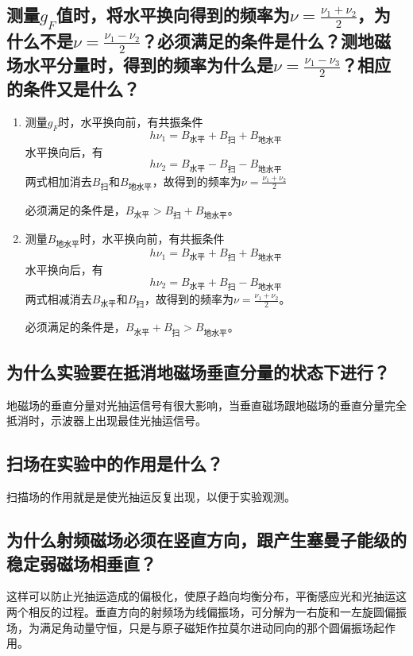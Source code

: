 \documentclass[a4paper]{article}
\begin{document}
\subsection{测量$g_F$值时，将水平换向得到的频率为$\nu = \frac{\nu_1+\nu_2}{2}$，为什么不是$\nu = \frac{\nu_1-\nu_2}{2}$？必须满足的条件是什么？测地磁场水平分量时，得到的频率为什么是$\nu = \frac{\nu_1-\nu_3}{2}$？相应的条件又是什么？}
\begin{enumerate}
\item 测量$g_F$时，水平换向前，有共振条件
\begin{equation*}
h\nu_1 = B_{\text{水平}}+B_{\text{扫}}+B_{\text{地水平}}
\end{equation*}
水平换向后，有
\begin{equation*}
h\nu_2 = B_{\text{水平}}-B_{\text{扫}}-B_{\text{地水平}}
\end{equation*}
两式相加消去$B_{\text{扫}}$和$B_{\text{地水平}}$，故得到的频率为$\nu = \frac{\nu_1+\nu_2}{2}$

必须满足的条件是，$B_{\text{水平}}>B_{\text{扫}}+B_{\text{地水平}}$。
\item 测量$B_{\text{地水平}}$时，水平换向前，有共振条件
\begin{equation*}
h\nu_1 = B_{\text{水平}}+B_{\text{扫}}+B_{\text{地水平}}
\end{equation*}
水平换向后，有
\begin{equation*}
h\nu_2 = B_{\text{水平}}+B_{\text{扫}}-B_{\text{地水平}}
\end{equation*}
两式相减消去$B_{\text{水平}}$和$B_{\text{扫}}$，故得到的频率为$\nu = \frac{\nu_1+\nu_2}{2}$。

必须满足的条件是，$B_{\text{水平}}+B_{\text{扫}}>B_{\text{地水平}}$。
\end{enumerate}
\subsection{为什么实验要在抵消地磁场垂直分量的状态下进行？}
地磁场的垂直分量对光抽运信号有很大影响，当垂直磁场跟地磁场的垂直分量完全抵消时，示波器上出现最佳光抽运信号。
\subsection{扫场在实验中的作用是什么？}
扫描场的作用就是是使光抽运反复出现，以便于实验观测。
\subsection{为什么射频磁场必须在竖直方向，跟产生塞曼子能级的稳定弱磁场相垂直？}
这样可以防止光抽运造成的偏极化，使原子趋向均衡分布，平衡感应光和光抽运这两个相反的过程。垂直方向的射频场为线偏振场，可分解为一右旋和一左旋圆偏振场，为满足角动量守恒，只是与原子磁矩作拉莫尔进动同向的那个圆偏振场起作用。
\end{document}
